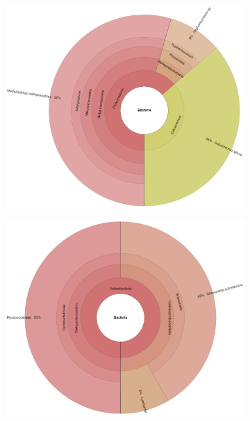     \begin{figure}[H]
        \centering
        \begin{subfigure}[b]{0.3\textwidth}
        \includegraphics[width=1\textwidth]{figures/results/real/krona/krona-us-sSRR17578350.png}
        \label{fig:results:real:krona-us-a}
        \end{subfigure}
        \hfill
        \begin{subfigure}[b]{0.3\textwidth}
        \includegraphics[width=1\textwidth]{figures/results/real/krona/krona-us-sSRR20997582.png}

\end{subfigure}
\end{figure}
